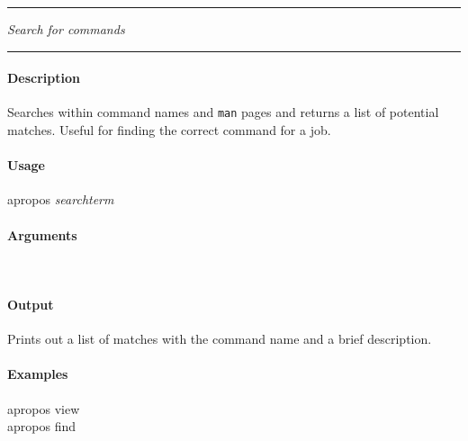 
\hrule
\vspace{1mm}

 {\emph{Search for commands}}{}

\hrule
\vspace{4mm}

\paragraph{Description}
\indentpar \raggedright \textrm{Searches within command names and \texttt{man} pages and returns a list of potential matches. Useful for finding the correct command for a job.}\\

\paragraph{Usage}
\indentpar apropos \textit{searchterm}

\paragraph{Arguments}
\indentpar {}\\

\paragraph{Output}
\indentpar \textrm{Prints out a list of matches with the command name and a brief description.}

\paragraph{Examples}

\indentpar apropos view\\
\indentpar apropos find

\vspace{20mm}
